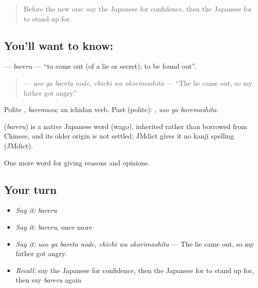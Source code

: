 \label{lesson:JA-C343-bareru}



\begin{quote}
Before the new one: say the Japanese for confidence, then the Japanese for to stand up for.
\end{quote}

\subsection*{You'll want to know: }
\textbf{} — \emph{bareru} — \textquotedblleft{}to come out (of a lie or secret); to be found out\textquotedblright{}.

\begin{quote}
\textbf{  } — \emph{uso ga bareta node, chichi wa okorimashita} — \textquotedblleft{}The lie came out, so my father got angry.\textquotedblright{}
\end{quote}

Polite \textbf{}, \emph{baremasu}; an ichidan verb. Past (polite): \textbf{ }, \emph{uso ga baremashita}.

\begin{cousinweb}
\textbf{} (\emph{bareru}) is a native Japanese word (wago), inherited rather than borrowed from Chinese, and its older origin is not settled; JMdict gives it no kanji spelling (JMdict).
\end{cousinweb}

\begin{grammarlens}[title={What you've built}]
One more word for giving reasons and opinions.
\end{grammarlens}

\subsection*{Your turn}
\begin{itemize}
\raggedright
  \item \emph{Say it:} \emph{bareru}
  \item \emph{Say it:} \emph{bareru}, once more
  \item \emph{Say it:} \emph{uso ga bareta node, chichi wa okorimashita} — The lie came out, so my father got angry.
  \item \emph{Recall:} say the Japanese for confidence, then the Japanese for to stand up for, then say \emph{bareru} again
\end{itemize}

